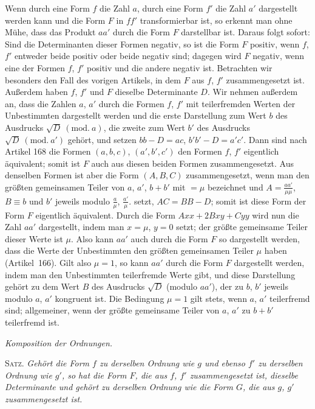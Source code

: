 Wenn durch eine Form $f$ die Zahl $a$, durch eine Form $f'$ die Zahl $a'$ dargestellt werden kann und die Form $F$ in $ff'$ transformierbar ist, so erkennt man ohne Mühe, dass das Produkt $aa'$ durch die Form $F$ darstellbar ist. Daraus folgt sofort: Sind die Determinanten dieser Formen negativ, so ist die Form $F$ positiv, wenn $f$, $f'$ entweder beide positiv oder beide negativ sind; dagegen wird $F$ negativ, wenn eine der Formen $f$, $f'$ positiv und die andere negativ ist. Betrachten wir besonders den Fall des vorigen Artikels, in dem $F$ aus $f$, $f'$ zusammengesetzt ist. Außerdem haben $f$, $f'$ und $F$ dieselbe Determinante $D$. Wir nehmen außerdem an, dass die Zahlen $a$, $a'$ durch die Formen $f$, $f'$ mit teilerfremden Werten der Unbestimmten dargestellt werden und die erste Darstellung zum Wert $b$ des Ausdrucks $\surd D\ (\mathrm{mod.}\ a)$, die zweite zum Wert $b'$ des Ausdrucks $\surd D\ (\mathrm{mod.}\ a')$ gehört, und setzen $bb-D=ac$, $b'b'-D=a'c'$. Dann sind nach Artikel 168 die Formen $(a,b,c)$, $(a',b',c')$ den Formen $f$, $f'$ eigentlich äquivalent; somit ist $F$ auch aus diesen beiden Formen zusammengesetzt. Aus denselben Formen ist aber die Form $(A,B,C)$ zusammengesetzt, wenn man den größten gemeinsamen Teiler von $a$, $a'$, $b+b'$ mit $=\mu$ bezeichnet und $A=\frac{aa'}{\mu\mu}$, $B\equiv b$ und $b'$ jeweils modulo $\frac{a}{\mu}$, $\frac{a'}{\mu}$. setzt,
$AC=BB-D$; somit ist diese Form der Form $F$ eigentlich äquivalent. Durch die Form $Axx+2Bxy+Cyy$ wird nun die Zahl $aa'$ dargestellt, indem man $x=\mu$, $y=0$ setzt; der größte gemeinsame Teiler dieser Werte ist $\mu$. Also kann $aa'$ auch durch die Form $F$ so dargestellt werden, dass die Werte der Unbestimmten den größten gemeinsamen Teiler $\mu$ haben (Artikel~166). Gilt also $\mu=1$, so kann $aa'$ durch die Form $F$ dargestellt werden, indem man den Unbestimmten teilerfremde Werte gibt, und diese Darstellung gehört zu dem Wert $B$ des Ausdrucks $\surd D$ (modulo $aa'$), der zu $b$, $b'$ jeweils modulo $a$, $a'$ kongruent ist. Die Bedingung $\mu=1$ gilt stets, wenn $a$, $a'$ teilerfremd sind; allgemeiner, wenn der größte gemeinsame Teiler von $a$, $a'$ zu $b+b'$ teilerfremd ist.

\begin{center}
\textit{Komposition der Ordnungen.}
\end{center}

\textsc{Satz.} \textit{Gehört die Form $f$ zu derselben Ordnung wie $g$ und ebenso $f'$ zu derselben Ordnung wie $g'$, so hat die Form $F$, die aus $f$, $f'$ zusammengesetzt ist, dieselbe Determinante und gehört zu derselben Ordnung wie die Form $G$, die aus $g$, $g'$ zusammengesetzt ist.}

